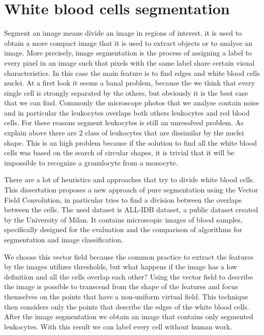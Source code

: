 \section*{White blood cells segmentation}
Segment an image means divide an image in regions of interest. it is used to obtain a more compact image that it is used to extract objects or to analyse an image. More precisely, image segmentation is the process of assigning a label to every pixel in an image such that pixels with the same label share certain visual characteristics. In this case the main feature is to find edges and white blood cells nuclei. At a first look it seems a banal problem, because the we think that every single cell is strongly separated by the others, but obviously it is the best case that we can find. Commonly the microscope photos that we analyse contain noise and in particular the leukocytes overlaps both others leukocytes and red blood cells. For these reasons segment leukocytes is still an unresolved problem. As explain above there are 2 class of leukocytes that are dissimilar by the nuclei shape. This is an high problem because if the solution to find all the white blood cells was based on the search of circular shapes, it is trivial that it will be impossible to recognize a granulocyte from a monocyte.


\bigskip


There are a lot of heuristics and approaches that try to divide white blood cells. This dissertation proposes a new approach of pure segmentation using the Vector Field Convolution, in particular tries to find a division between the overlaps between the cells. The used dataset is ALL-IDB dataset, a public dataset created by the University of Milan. It contains microscopic images of blood samples, specifically designed for the evaluation and the comparison of algorithms for segmentation and image classification.


\bigskip 


We choose this vector field because the common practice to extract the features by the images utilizes thresholds, but what happens if the image has a low definition and all the cells overlap each other? Using the vector field to describe the image is possible to transcend from the shape of the features and focus themselves on the points that have a non-uniform virtual field. This technique then considers only the points that describe the edges of the white blood cells. After the image segmentation we obtain an image that contains only segmented leukocytes. With this result we can label every cell without human work.


